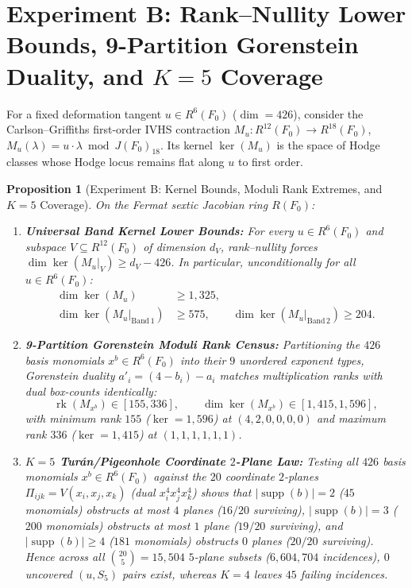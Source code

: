\documentclass[11pt,a4paper]{amsart}
\newtheorem{proposition}[theorem]{Proposition}
\theoremstyle{definition}
\theoremstyle{remark}
\DeclareMathOperator{\rk}{rk}
\begin{document}
\section{Experiment B: Rank--Nullity Lower Bounds, 9-Partition Gorenstein Duality, and \texorpdfstring{$K=5$}{K=5} Coverage}
\label{sec:thmB}

For a fixed deformation tangent $u \in R^6(F_0)$ ($\dim = 426$), consider the Carlson--Griffiths first-order IVHS contraction $M_u : R^{12}(F_0) \to R^{18}(F_0)$, $M_u(\lambda) = u \cdot \lambda \bmod J(F_0)_{18}$. Its kernel $\ker(M_u)$ is the space of Hodge classes whose Hodge locus remains flat along $u$ to first order.

\begin{proposition}[Experiment B: Kernel Bounds, Moduli Rank Extremes, and $K=5$ Coverage]
\label{thm:B}
On the Fermat sextic Jacobian ring $R(F_0)$:
\begin{enumerate}[label=(\roman*)]
\item \textbf{Universal Band Kernel Lower Bounds:} For \emph{every} $u \in R^6(F_0)$ and subspace $V \subseteq R^{12}(F_0)$ of dimension $d_V$, rank--nullity forces $\dim \ker(M_u|_V) \ge d_V - 426$. In particular, unconditionally for all $u \in R^6(F_0)$:
\begin{align*}
\dim \ker(M_u) &\ge 1,325, \\
\dim \ker(M_u|_{\mathrm{Band\,1}}) &\ge 575, \qquad \dim \ker(M_u|_{\mathrm{Band\,2}}) \ge 204.
\end{align*}
\item \textbf{9-Partition Gorenstein Moduli Rank Census:} Partitioning the $426$ basis monomials $x^b \in R^6(F_0)$ into their $9$ unordered exponent types, Gorenstein duality $a'_i = (4-b_i)-a_i$ matches multiplication ranks with dual box-counts identically:
\[
\rk(M_{x^b}) \in [155, 336], \qquad \dim \ker(M_{x^b}) \in [1,415, 1,596],
\]
with minimum rank $155$ ($\ker = 1,596$) at $(4,2,0,0,0,0)$ and maximum rank $336$ ($\ker = 1,415$) at $(1,1,1,1,1,1)$.
\item \textbf{$K=5$ Tur\'an/Pigeonhole Coordinate $2$-Plane Law:} Testing all $426$ basis monomials $x^b \in R^6(F_0)$ against the $20$ coordinate $2$-planes $\Pi_{ijk} = V(x_i,x_j,x_k)$ (dual $x_i^4 x_j^4 x_k^4$) shows that $|\operatorname{supp}(b)|=2$ ($45$ monomials) obstructs at most $4$ planes ($16/20$ surviving), $|\operatorname{supp}(b)|=3$ ($200$ monomials) obstructs at most $1$ plane ($19/20$ surviving), and $|\operatorname{supp}(b)|\ge 4$ ($181$ monomials) obstructs $0$ planes ($20/20$ surviving). Hence across all $\binom{20}{5} = 15,504$ $5$-plane subsets ($6,604,704$ incidences), $0$ uncovered $(u, S_5)$ pairs exist, whereas $K=4$ leaves $45$ failing incidences.
\end{enumerate}
\end{proposition}
\end{document}
